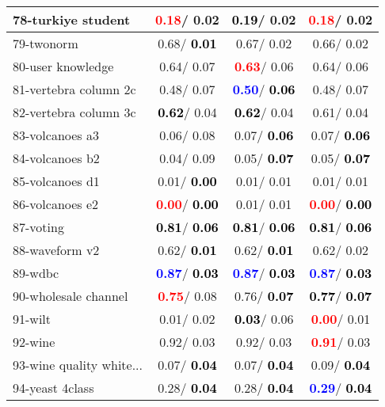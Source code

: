 \begin{table}[h]
\begin{center}
\begin{tabular}{lc|c|c}
78-turkiye student & \textcolor{red}{\textbf{  0.18}}/  0.02 & \textcolor{black}{\textbf{  0.19}}/  0.02 & \textcolor{red}{\textbf{  0.18}}/  0.02 \\ \hline
79-twonorm &   0.68/\textcolor{black}{\textbf{  0.01}} &   0.67/  0.02 &   0.66/  0.02 \\
80-user knowledge &   0.64/  0.07 & \textcolor{red}{\textbf{  0.63}}/  0.06 &   0.64/  0.06 \\
81-vertebra column 2c &   0.48/  0.07 & \textcolor{blue}{\textbf{  0.50}}/\textcolor{black}{\textbf{  0.06}} &   0.48/  0.07 \\
82-vertebra column 3c & \textcolor{black}{\textbf{  0.62}}/  0.04 & \textcolor{black}{\textbf{  0.62}}/  0.04 &   0.61/  0.04 \\
83-volcanoes a3 &   0.06/  0.08 &   0.07/\textcolor{black}{\textbf{  0.06}} &   0.07/\textcolor{black}{\textbf{  0.06}} \\
84-volcanoes b2 &   0.04/  0.09 &   0.05/\textcolor{black}{\textbf{  0.07}} &   0.05/\textcolor{black}{\textbf{  0.07}} \\
85-volcanoes d1 &   0.01/\textcolor{black}{\textbf{  0.00}} &   0.01/  0.01 &   0.01/  0.01 \\ \hline
86-volcanoes e2 & \textcolor{red}{\textbf{  0.00}}/\textcolor{black}{\textbf{  0.00}} &   0.01/  0.01 & \textcolor{red}{\textbf{  0.00}}/\textcolor{black}{\textbf{  0.00}} \\
87-voting & \textcolor{black}{\textbf{  0.81}}/\textcolor{black}{\textbf{  0.06}} & \textcolor{black}{\textbf{  0.81}}/\textcolor{black}{\textbf{  0.06}} & \textcolor{black}{\textbf{  0.81}}/\textcolor{black}{\textbf{  0.06}} \\
88-waveform v2 &   0.62/\textcolor{black}{\textbf{  0.01}} &   0.62/\textcolor{black}{\textbf{  0.01}} &   0.62/  0.02 \\
89-wdbc & \textcolor{blue}{\textbf{  0.87}}/\textcolor{black}{\textbf{  0.03}} & \textcolor{blue}{\textbf{  0.87}}/\textcolor{black}{\textbf{  0.03}} & \textcolor{blue}{\textbf{  0.87}}/\textcolor{black}{\textbf{  0.03}} \\
90-wholesale channel & \textcolor{red}{\textbf{  0.75}}/  0.08 &   0.76/\textcolor{black}{\textbf{  0.07}} & \textcolor{black}{\textbf{  0.77}}/\textcolor{black}{\textbf{  0.07}} \\
91-wilt &   0.01/  0.02 & \textcolor{black}{\textbf{  0.03}}/  0.06 & \textcolor{red}{\textbf{  0.00}}/  0.01 \\
92-wine &   0.92/  0.03 &   0.92/  0.03 & \textcolor{red}{\textbf{  0.91}}/  0.03 \\ \hline
93-wine quality white... &   0.07/\textcolor{black}{\textbf{  0.04}} &   0.07/\textcolor{black}{\textbf{  0.04}} &   0.09/\textcolor{black}{\textbf{  0.04}} \\
94-yeast 4class &   0.28/\textcolor{black}{\textbf{  0.04}} &   0.28/\textcolor{black}{\textbf{  0.04}} & \textcolor{blue}{\textbf{  0.29}}/\textcolor{black}{\textbf{  0.04}} \\\end{tabular}\label{stratsALCKappa2bNBRedux}
\end{center}
\end{table}